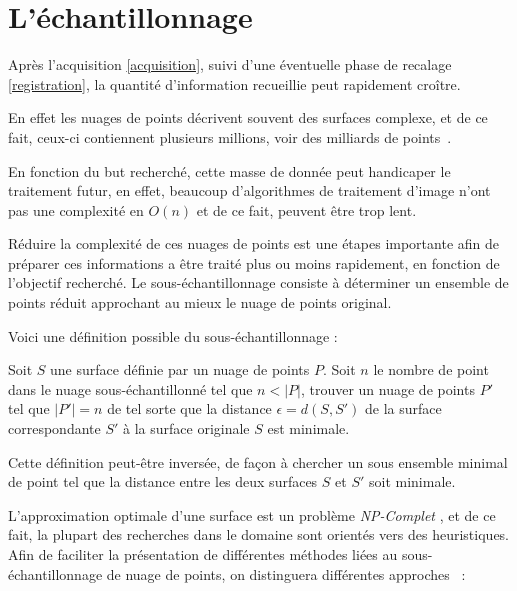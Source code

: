 \chapter{L'échantillonnage}

Après l'acquisition \ref{acquisition}, suivi d'une éventuelle phase de recalage \ref{registration}, la quantité d'information recueillie peut rapidement croître.

En effet les nuages de points  décrivent souvent des surfaces complexe, et de ce fait, ceux-ci contiennent plusieurs millions, voir des milliards de points~\cite{Levoy}.

En fonction du but recherché, cette masse de donnée peut handicaper le traitement futur, en effet, beaucoup d'algorithmes de traitement d'image n'ont pas une complexité en $O(n)$ et de ce fait, peuvent être trop lent.

Réduire la complexité de ces nuages de points  est une étapes importante afin de préparer ces informations a être traité plus ou moins rapidement, en fonction de l'objectif recherché. Le sous-échantillonnage consiste à déterminer un ensemble de points réduit approchant au mieux le nuage de points  original.

Voici une définition possible du sous-échantillonnage  \cite{Pauly2003}:

\begin{definition}
  Soit $S$ une surface définie par un nuage de points $P$. Soit $n$ le nombre de point dans le nuage sous-échantillonné tel que $n<|P|$, trouver un nuage de points $P'$ tel que $|P'|=n$ de tel sorte que la distance $\epsilon = d(S,S')$ de la surface correspondante $S'$ à la surface originale $S$ est minimale.
\end{definition}

Cette définition peut-être inversée, de façon à chercher un sous ensemble minimal de point tel que la distance entre les deux surfaces $S$ et $S'$ soit minimale.

L'approximation optimale d'une surface est un problème \emph{NP-Complet} \cite{Agarwal1994}, et de ce fait, la plupart des recherches dans le domaine sont orientés vers des heuristiques.\\

Afin de faciliter la présentation de différentes méthodes liées au sous-échantillonnage de nuage de points, on distinguera différentes approches ~\cite{Pauly2002}:

